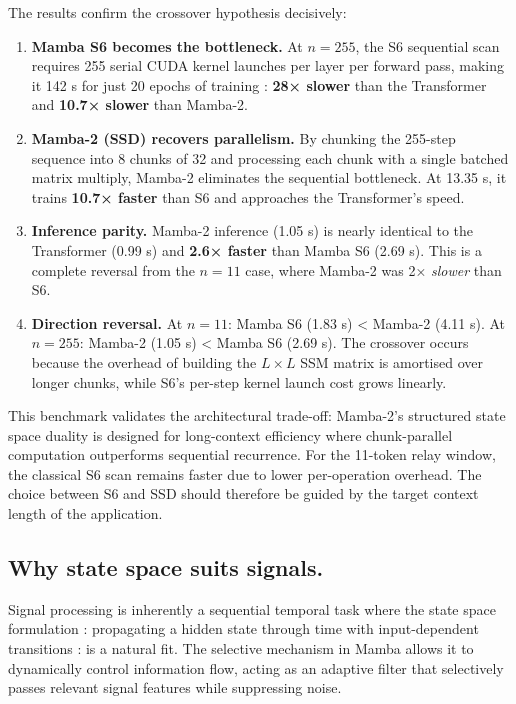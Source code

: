 The results confirm the crossover hypothesis decisively:

\begin{enumerate}
\def\labelenumi{\arabic{enumi}.}
\item
  \textbf{Mamba S6 becomes the bottleneck.} At \(n = 255\), the S6 sequential scan requires 255 serial CUDA kernel launches per layer per forward pass, making it 142 s for just 20 epochs of training : \textbf{28× slower} than the Transformer and \textbf{10.7× slower} than Mamba-2.
\item
  \textbf{Mamba-2 (SSD) recovers parallelism.} By chunking the 255-step sequence into 8 chunks of 32 and processing each chunk with a single batched matrix multiply, Mamba-2 eliminates the sequential bottleneck. At 13.35 s, it trains \textbf{10.7× faster} than S6 and approaches the Transformer's speed.
\item
  \textbf{Inference parity.} Mamba-2 inference (1.05 s) is nearly identical to the Transformer (0.99 s) and \textbf{2.6× faster} than Mamba S6 (2.69 s). This is a complete reversal from the \(n = 11\) case, where Mamba-2 was 2× \emph{slower} than S6.
\item
  \textbf{Direction reversal.} At \(n = 11\): Mamba S6 (1.83 s) \textless{} Mamba-2 (4.11 s). At \(n = 255\): Mamba-2 (1.05 s) \textless{} Mamba S6 (2.69 s). The crossover occurs because the overhead of building the \(L \times L\) SSM matrix is amortised over longer chunks, while S6's per-step kernel launch cost grows linearly.
\end{enumerate}

This benchmark validates the architectural trade-off: Mamba-2's structured state space duality is designed for long-context efficiency where chunk-parallel computation outperforms sequential recurrence. For the 11-token relay window, the classical S6 scan remains faster due to lower per-operation overhead. The choice between S6 and SSD should therefore be guided by the target context length of the application.

\subsection{Why state space suits signals.} Signal processing is inherently a sequential temporal task where the state space formulation : propagating a hidden state through time with input-dependent transitions : is a natural fit. The selective mechanism in Mamba allows it to dynamically control information flow, acting as an adaptive filter that selectively passes relevant signal features while suppressing noise.

